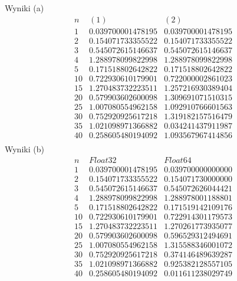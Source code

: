 
Wyniki (a)
$$
\begin{array}{c|c|c}
n & (1) & (2)\\
\hline
1 & 0.039700001478195 & 0.039700001478195\\
2 & 0.154071733355522 & 0.154071733355522\\
3 & 0.545072615146637 & 0.545072615146637\\
4 & 1.288978099822998 & 1.288978099822998\\
5 & 0.171518802642822 & 0.171518802642822\\
10 & 0.722930610179901 & 0.722000002861023\\
15 & 1.270483732223511 & 1.257216930389404\\
20 & 0.579903602600098 & 1.309691071510315\\
25 & 1.007080554962158 & 1.092910766601563\\
30 & 0.752920925617218 & 1.319182157516479\\
35 & 1.021098971366882 & 0.034241437911987\\
40 & 0.258605480194092 & 1.093567967414856\\
\end{array}
$$
Wyniki (b)
$$
\begin{array}{c|c|c}
n & Float32 & Float64\\
\hline
1 & 0.039700001478195 & 0.039700000000000\\
2 & 0.154071733355522 & 0.154071730000000\\
3 & 0.545072615146637 & 0.545072626044421\\
4 & 1.288978099822998 & 1.288978001188801\\
5 & 0.171518802642822 & 0.171519142109176\\
10 & 0.722930610179901 & 0.722914301179573\\
15 & 1.270483732223511 & 1.270261773935077\\
20 & 0.579903602600098 & 0.596529312494691\\
25 & 1.007080554962158 & 1.315588346001072\\
30 & 0.752920925617218 & 0.374146489639287\\
35 & 1.021098971366882 & 0.925382128557105\\
40 & 0.258605480194092 & 0.011611238029749\\
\end{array}
$$
